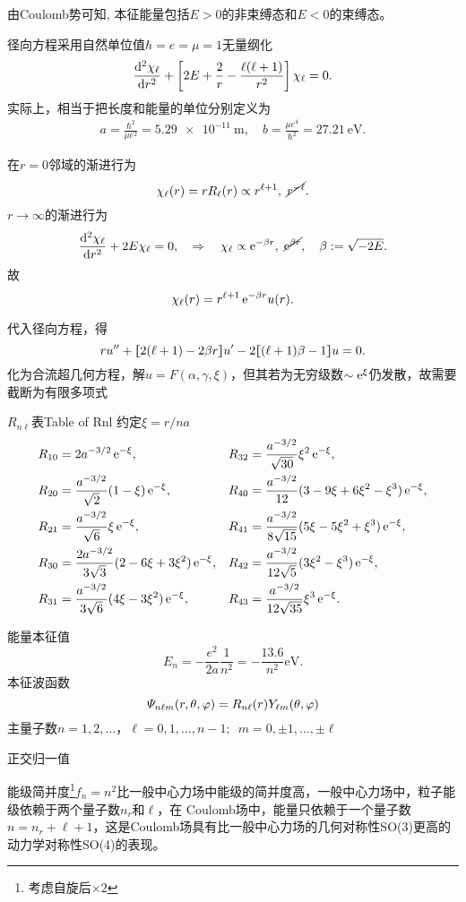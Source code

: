 由Coulomb势可知, 本征能量包括$E>0$的非束缚态和$E<0$的束缚态。

径向方程采用自然单位值$\hbar=e=\mu=1$无量纲化
\[
	\dv[2]{\chi_\ell}r+\fkh{2E+\frac2r-\frac{\ell(\ell+1)}{r^2}}\chi_\ell=0.
\]
实际上，相当于把长度和能量的单位分别定义为
\begin{align}
	a=\frac{\hbar^2}{\mu e^2}=\SI{5.29e-11}\m,\quad b=\frac{\mu e^4}{\hbar^2}=\SI{27.21}\eV.
\end{align}

在$r=0$邻域的渐进行为
\[
	\chi_\ell(r)=rR_\ell(r)\propto r^{\ell+1},\;\cancel{r^{-\ell}}.
\]
$r\to\infty$的渐进行为
\[
	\dv[2]{\chi_\ell}r+2E\chi_\ell=0,\thus\chi_\ell\propto\e{-\beta r},\;\cancel{\e{\beta r}},\quad \beta:=\sqrt{-2E}.
\]
故
\[
	\chi_\ell(r)=r^{\ell+1}\e{-\beta r}u(r).
\]

代入径向方程，得
\[
	ru''+\zkh{2(\ell+1)-2\beta r}u'-2\zkh{(\ell+1)\beta-1}u=0.
\]
化为合流超几何方程，解$u=F(\alpha,\gamma,\xi)$，但其若为无穷级数$\sim\e{\xi}$仍发散，故需要截断为有限多项式
\begin{example}{$R_{n\ell}$表}{Table of Rnl}
	约定$\xi=r/na$
	{\small\begin{align*}
		R_{10} & =2a^{-3/2}\e{-\xi},&R_{32} & =\frac{a^{-3/2}}{\sqrt{30}}\xi^2\e{-\xi},\\
		R_{20} & =\frac{a^{-3/2}}{\sqrt2}(1-\xi)\e{-\xi},&R_{40} & =\frac{a^{-3/2}}{12}(3-9\xi+6\xi^2-\xi^3)\e{-\xi},\\
		R_{21} & =\frac{a^{-3/2}}{\sqrt6}\xi\e{-\xi},&R_{41} & =\frac{a^{-3/2}}{8\sqrt{15}}(5\xi-5\xi^2+\xi^3)\e{-\xi},\\
		R_{30} & =\frac{2a^{-3/2}}{3\sqrt3}(2-6\xi+3\xi^2)\e{-\xi},&R_{42} & =\frac{a^{-3/2}}{12\sqrt5}(3\xi^2-\xi^3)\e{-\xi},\\
		R_{31} & =\frac{a^{-3/2}}{3\sqrt6}(4\xi-3\xi^2)\e{-\xi},&R_{43} & =\frac{a^{-3/2}}{12\sqrt{35}}\xi^3\e{-\xi}.
	\end{align*}}
\end{example}
能量本征值
\[
	E_n=-\frac{e^2}{2a}\frac1{n^2}=-\frac{13.6}{n^2}\si\eV.
\]
本征波函数
\[
	\varPsi_{n\ell m}(r,\theta,\vf)=R_{n\ell}(r)Y_{\ell m}(\ct,\vf)
\]
主量子数$n=1,2,\ldots$，$\ell=0,1,\ldots,n-1;\enspace m=0,\pm 1,\ldots,\pm\ell$

正交归一值

能级简并度\footnote{考虑自旋后$\times 2$}$f_n=n^2$比一般中心力场中能级的简并度高，一般中心力场中，粒子能级依赖于两个量子数$n_r$和$\ell$，在
Coulomb场中，能量只依赖于一个量子数$n=n_r+\ell+1$，这是Coulomb场具有比一般中心力场的几何对称性SO(3)更高的动力学对称性SO(4)的表现。

